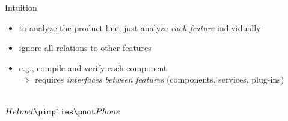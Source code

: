\begin{frame}{\myframetitle}
	\begin{fancycolumns}
		\begin{definition}{Intuition}
			\begin{itemize}
				\item to analyze the product line, just analyze \emph{each feature} individually
				\item ignore all relations to other features
				\item e.g., compile and verify each component\\
				$\Rightarrow$ requires \emph{interfaces between features} (components, services, plug-ins) %
			\end{itemize}
		\end{definition}
		\begin{exampletight}{}
			\centering\featureDiagramLego\\$Helmet \pimplies \pnot Phone$
		\end{exampletight}
	\nextcolumn
	\end{fancycolumns}
\end{frame}

